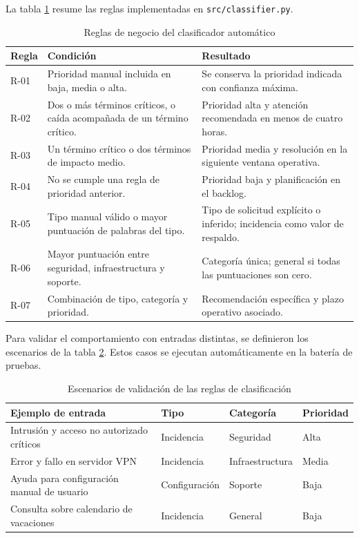 La tabla \ref{tabla:reglas_clasificador} resume las reglas implementadas en \texttt{src/classifier.py}.

\begin{table}[ht]
\centering
\small
\begin{tabularx}{\textwidth}{l X X}
\textbf{Regla} & \textbf{Condición} & \textbf{Resultado} \\
\hline
R-01 & Prioridad manual incluida en baja, media o alta. & Se conserva la prioridad indicada con confianza máxima. \\
R-02 & Dos o más términos críticos, o caída acompañada de un término crítico. & Prioridad alta y atención recomendada en menos de cuatro horas. \\
R-03 & Un término crítico o dos términos de impacto medio. & Prioridad media y resolución en la siguiente ventana operativa. \\
R-04 & No se cumple una regla de prioridad anterior. & Prioridad baja y planificación en el backlog. \\
R-05 & Tipo manual válido o mayor puntuación de palabras del tipo. & Tipo de solicitud explícito o inferido; incidencia como valor de respaldo. \\
R-06 & Mayor puntuación entre seguridad, infraestructura y soporte. & Categoría única; general si todas las puntuaciones son cero. \\
R-07 & Combinación de tipo, categoría y prioridad. & Recomendación específica y plazo operativo asociado. \\
\end{tabularx}
\caption{Reglas de negocio del clasificador automático}
\label{tabla:reglas_clasificador}
\end{table}

Para validar el comportamiento con entradas distintas, se definieron los escenarios de la tabla \ref{tabla:escenarios_clasificador}. Estos casos se ejecutan automáticamente en la batería de pruebas.

\begin{table}[ht]
\centering
\small
\begin{tabularx}{\textwidth}{X l l l}
\textbf{Ejemplo de entrada} & \textbf{Tipo} & \textbf{Categoría} & \textbf{Prioridad} \\
\hline
Intrusión y acceso no autorizado críticos & Incidencia & Seguridad & Alta \\
Error y fallo en servidor VPN & Incidencia & Infraestructura & Media \\
Ayuda para configuración manual de usuario & Configuración & Soporte & Baja \\
Consulta sobre calendario de vacaciones & Incidencia & General & Baja \\
\end{tabularx}
\caption{Escenarios de validación de las reglas de clasificación}
\label{tabla:escenarios_clasificador}
\end{table}

